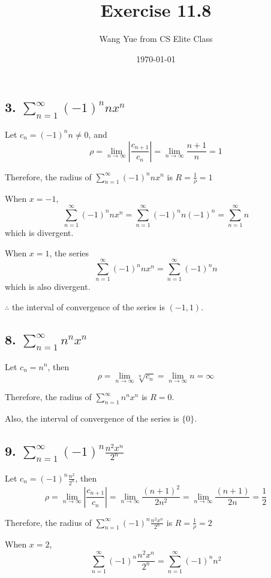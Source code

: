\documentclass{article}
\begin{document}
    \title{Exercise 11.8}
    \author{Wang Yue from CS Elite Class}
    \date{\today}

    \maketitle

    \subsection*{3. $\sum_{n=1}^\infty (-1)^n nx^n$}

    Let $c_n = (-1)^nn \not = 0$, and $$\rho = \lim_{n\to\infty}|\frac{c_{n+1}}{c_n}| = \lim_{n\to\infty}\frac{n+1}{n} = 1$$

    Therefore, the radius of $\sum_{n=1}^\infty (-1)^n nx^n$ is $R = \frac{1}{\rho} = 1$

    When $x=-1$, $$\sum_{n=1}^\infty (-1)^n nx^n = \sum_{n=1}^\infty (-1)^{n} n (-1)^{n} = \sum_{n=1}^\infty n$$ which is divergent.

    When $x=1$, the series $$\sum_{n=1}^\infty (-1)^n nx^n = \sum_{n=1}^\infty (-1)^n n$$ which is also divergent.

    $\therefore $ the interval of convergence of the series is $(-1, 1)$.

    \subsection*{8. $\sum_{n=1}^\infty n^n x^n$}

    Let $c_n = n^n$, then $$\rho = \lim_{n\to\infty} \sqrt[n]{c_n} = \lim_{n\to\infty} n = \infty$$

    Therefore, the radius of $\sum_{n=1}^\infty n^n x^n$ is $R = 0$.

    Also, the interval of convergence of the series is $\{0\}$.

    \subsection*{9. $\sum_{n=1}^\infty (-1)^n \frac{n^2 x^n}{2^n}$}

    Let $c_n = (-1)^n \frac{n^2}{2^n}$, then $$\rho = \lim_{n\to\infty}| \frac{c_{n+1}}{c_n} | = \lim_{n\to\infty}\frac{(n+1)^2}{2n^2} = \lim_{n\to\infty}\frac{(n+1)}{2n} = \frac 1 2$$

    Therefore, the radius of $\sum_{n=1}^\infty (-1)^n \frac{n^2 x^n}{2^n}$ is $R = \frac{1}{\rho} = 2$

    When $x = 2$, $$\sum_{n=1}^\infty (-1)^n \frac{n^2 x^n}{2^n} = \sum_{n=1}^\infty (-1)^n n^2$$
\end{document}
